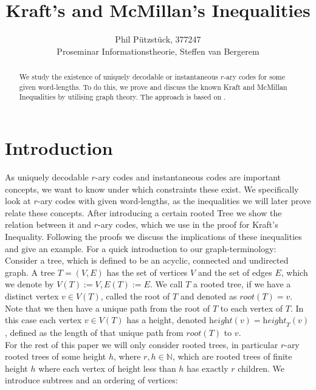 \documentclass[12pt]{article}
\newcommand{\he}[0]{\textit{height}}
\newcommand{\ro}[0]{\textit{root}}
\begin{document}
\title{Kraft's and McMillan's Inequalities}
\author{Phil Pützstück, 377247\\
Proseminar Informationstheorie, Steffen van Bergerem}
\maketitle

\begin{abstract}
    We study the existence of uniquely decodable or instantaneous $r$-ary codes for some given word-lengths.
    To do this, we prove and discuss the known Kraft and McMillan Inequalities by utilising graph theory.
    The approach is based on \cite{ICT}.
\end{abstract}

\section*{Introduction}
As uniquely decodable $r$-ary codes and instantaneous codes are important concepts,
we want to know under which constraints these exist.
We specifically look at $r$-ary codes with given word-lengths, as the inequalities
we will later prove relate these concepts. After introducing a certain rooted Tree we show the relation between it and $r$-ary codes, which we use in the proof for Kraft's Inequality. Following the proofs we discuss the implications of these inequalities and give an example.
For a quick introduction to our graph-terminology:\\[10pt]
Consider a tree, which is defined to be an acyclic, connected and undirected graph.
A tree $T = (V,E)$ has the set of vertices $V$ and the set of edges $E$, which we denote by $V(T) := V, E(T) := E$.
We call $T$ a rooted tree, if we have a distinct vertex $v \in V(T)$,
called the root of $T$ and denoted as $\ro(T) = v$.
Note that we then have a unique path from the root of $T$ to each vertex of $T$.
In this case each vertex $v \in V(T)$ has a height, denoted $\he(v) = \he_T(v)$,
defined as the length of that unique path from $\ro(T)$ to $v$.\\[10pt]
For the rest of this paper we will only consider rooted trees, in particular $r$-ary rooted trees of some height $h$, where $r,h \in \mathbb{N}$, which
are rooted trees of finite height $h$ where each vertex of height less than $h$ has exactly $r$ children.
We introduce subtrees and an ordering of vertices:
\end{document}
